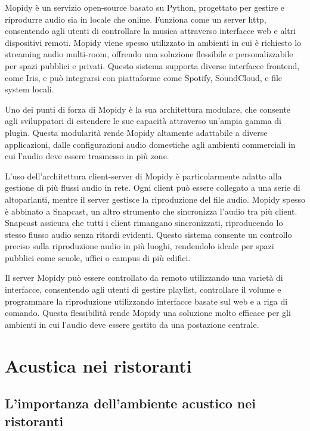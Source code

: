 Mopidy è un servizio open-source  basato su Python, progettato per gestire e riprodurre audio sia in locale che online. Funziona come un server \gls{http}, consentendo agli utenti di controllare la musica attraverso interfacce web e altri dispositivi remoti. Mopidy viene spesso utilizzato in ambienti in cui è richiesto lo streaming audio multi-room, offrendo una soluzione flessibile e personalizzabile per spazi pubblici e privati. Questo sistema supporta diverse interfacce frontend, come Iris, e può integrarsi con piattaforme come Spotify, SoundCloud, e file system locali.

Uno dei punti di forza di Mopidy è la sua architettura modulare, che consente agli sviluppatori di estendere le sue capacità attraverso un'ampia gamma di plugin. Questa modularità rende Mopidy altamente adattabile a diverse applicazioni, dalle configurazioni audio domestiche agli ambienti commerciali in cui l'audio deve essere trasmesso in più zone.

L'uso dell'architettura client-server di Mopidy è particolarmente adatto alla gestione di più flussi audio in rete. Ogni client può essere collegato a una serie di altoparlanti, mentre il server gestisce la riproduzione del file audio. Mopidy spesso è abbinato a Snapcast, un altro strumento che sincronizza l'audio tra più client. Snapcast assicura che tutti i client rimangano sincronizzati, riproducendo lo stesso flusso audio senza ritardi evidenti. Questo sistema consente un controllo preciso sulla riproduzione audio in più luoghi, rendendolo ideale per spazi pubblici come scuole, uffici o campus di più edifici.

Il server Mopidy può essere controllato da remoto utilizzando una varietà di interfacce, consentendo agli utenti di gestire playlist, controllare il volume e programmare la riproduzione utilizzando interfacce basate sul web e a riga di comando. Questa flessibilità rende Mopidy una soluzione molto efficace per gli ambienti in cui l'audio deve essere gestito da una postazione centrale.

\section{Acustica nei ristoranti}

\subsection{L'importanza dell'ambiente acustico nei ristoranti}
\noindent

